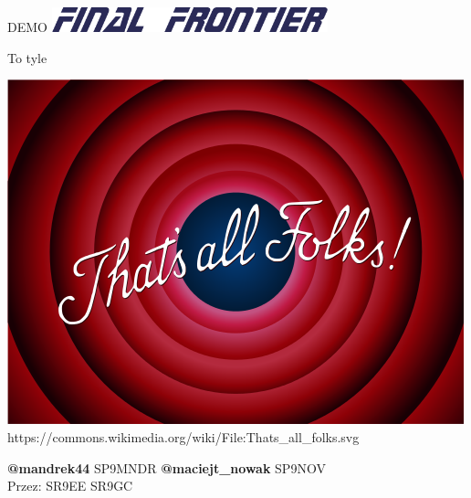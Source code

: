 \documentclass[ignorenonframetext]{beamer}
\begin{document}
\begin{frame}{DEMO}
	\centering
	\includegraphics[width=8cm]{images/final-frontier.png}
\end{frame}

\begin{frame}{To tyle}
\begin{center}
	\includegraphics[scale=0.4]{images/thats-all.png}
	\tiny{https://commons.wikimedia.org/wiki/File:Thats\_all\_folks.svg}
\end{center}
\begin{beamerboxesrounded}{}
	\begin{center}
		\textbf{@mandrek44} SP9MNDR \textbf{@maciejt\_nowak} SP9NOV\\
		Przez: SR9EE SR9GC
	\end{center}
\end{beamerboxesrounded}
\end{frame}
\end{document}
